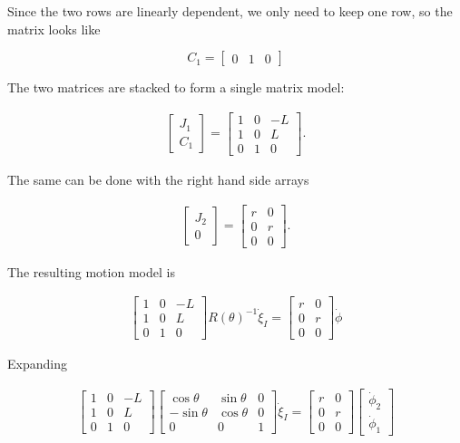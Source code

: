 Since the two rows are linearly dependent, we only need to keep one row,
so the matrix looks like

\[C_1 = \begin{bmatrix} 0 & 1 & 0 \end{bmatrix}\]

The two matrices are stacked to form a single matrix model:

\[\begin{aligned}
\begin{bmatrix}  J_1 \\[4mm] C_1 \end{bmatrix} =  \begin{bmatrix} 1 & 0 & -L \\ 1 & 0 & L \\ 0 & 1 & 0 \end{bmatrix}.
\end{aligned}\]

The same can be done with the right hand side arrays

\[\begin{aligned}
\begin{bmatrix} J_2 \\ 0\end{bmatrix} = \begin{bmatrix} r & 0 \\ 0 & r \\0& 0\end{bmatrix}.
\end{aligned}\]

The resulting motion model is

\[\begin{aligned}
\begin{bmatrix} 1 & 0 & -L \\ 1 & 0 & L \\ 0 & 1 & 0 \end{bmatrix} R(\theta)^{-1} \dot{\xi}_I
= \begin{bmatrix} r & 0 \\ 0 & r \\0& 0\end{bmatrix} \dot{\phi}
\end{aligned}\]

Expanding

\[\begin{aligned}
\begin{bmatrix} 1 & 0 & -L \\ 1 & 0 & L \\ 0 & 1 & 0 \end{bmatrix}
 \begin{bmatrix} \cos \theta & \sin \theta & 0 \\ -\sin \theta &
\cos \theta & 0 \\  0 & 0 & 1  \end{bmatrix}
 \dot{\xi}_I
= \begin{bmatrix} r & 0 \\ 0 & r \\0& 0\end{bmatrix}
\begin{bmatrix}\dot{\phi}_2 \\ \dot{\phi}_1\end{bmatrix}
\end{aligned}\]

